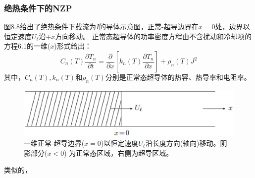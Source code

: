 \subsubsection*{绝热条件下的NZP}
图8.8给出了绝热条件下载流为$I$的导体示意图，正常-超导边界在$x=0$处，边界以恒定速度$U_\ell$沿$+x$方向移动。
正常态超导体的功率密度方程由不含扰动和冷却项的方程6.1的一维($x$)形式给出：
\begin{equation}%
C_n(T)\frac{\partial T_n}{\partial t}=\frac{\partial}{\partial x}\left[k_n(T)\frac{\partial T_n}{\partial x}\right]+\rho_n(T)J^2
\end{equation}
其中，$C_n(T),k_n(T)$和$\rho_n(T)$分别是正常态超导体的热容、热导率和电阻率。

\begin{figure}
	\centering
	\includegraphics[scale=0.6]{chpt8/figs/fig8.8.eps}
	\caption{一维正常-超导边界($x=0$)以恒定速度$U_\ell$沿长度方向(轴向)移动。阴影部分($x<0$)
		为正常态区域，右侧为超导区域。}
\end{figure}

类似的，






